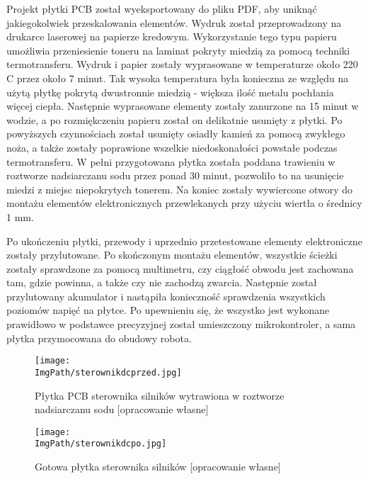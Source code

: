\documentclass[a4paper,12pt,twoside,openany]{report}
\newcommand{\ImgPath}{.}
\begin{document}
\newpage
Projekt płytki PCB został wyeksportowany do pliku PDF, aby uniknąć jakiegokolwiek przeskalowania elementów. Wydruk został przeprowadzony na drukarce laserowej na papierze kredowym. Wykorzystanie tego typu papieru umożliwia przeniesienie toneru na laminat pokryty miedzią za pomocą techniki termotransferu. Wydruk i papier zostały wyprasowane w temperaturze około 220 \textdegree C przez około 7 minut. Tak wysoka temperatura była konieczna ze względu na użytą płytkę pokrytą dwustronnie miedzią - większa ilość metalu pochłania więcej ciepła. Następnie wyprasowane elementy zostały zanurzone na 15 minut w wodzie, a po rozmiękczeniu papieru został on delikatnie usunięty z płytki. Po powyższych czynnościach został usunięty osiadły kamień za pomocą zwykłego noża, a także zostały poprawione wszelkie niedoskonałości powstałe podczas termotransferu. W pełni przygotowana płytka została poddana trawieniu w roztworze nadsiarczanu sodu przez ponad 30 minut, pozwoliło to na usunięcie miedzi z miejsc niepokrytych tonerem. Na koniec zostały wywiercone otwory do montażu elementów elektronicznych przewlekanych przy użyciu wiertła o średnicy 1 mm.

Po ukończeniu płytki, przewody i uprzednio przetestowane elementy elektroniczne zostały przylutowane. Po skończonym montażu elementów, wszystkie ścieżki zostały sprawdzone za pomocą multimetru, czy ciągłość obwodu jest zachowana tam, gdzie powinna, a także czy nie zachodzą zwarcia. Następnie został przylutowany akumulator i nastąpiła konieczność sprawdzenia wszystkich poziomów napięć na płytce. Po upewnieniu się, że wszystko jest wykonane prawidłowo w podstawce precyzyjnej został umieszczony mikrokontroler, a sama płytka przymocowana do obudowy robota.

\begin{figure}[!htbp]
	\begin{center}
\centering
\texttt{[image: \\ImgPath/sterownikdcprzed.jpg]}
\end{center}
	\caption{Płytka PCB sterownika silników wytrawiona w roztworze nadsiarczanu sodu [opracowanie własne]}
	\label{schematKomunikacji}
\end{figure}

\begin{figure}[!htbp]
	\begin{center}
\centering
\texttt{[image: \\ImgPath/sterownikdcpo.jpg]}
\end{center}
	\caption{Gotowa płytka sterownika silników [opracowanie własne]}
	\label{schematKomunikacji}
\end{figure}
\end{document}
